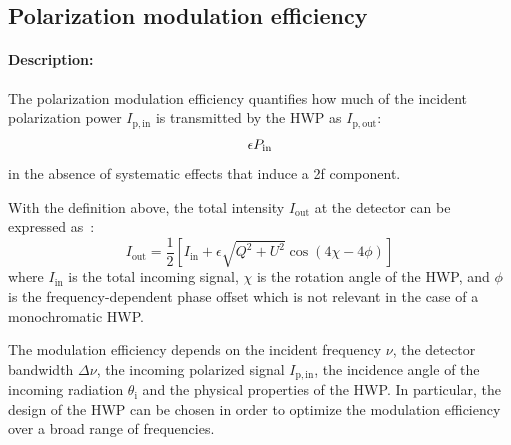 
\subsection{Polarization modulation efficiency}\label{subsec:modeff}

\paragraph{Description:}
The polarization modulation efficiency quantifies how much of the incident polarization power $I_\mathrm{p,in}$ is transmitted by the HWP as $I_\mathrm{p,out}$:
\begin{equation}
\epsilon\def \frac{P_\mathrm{out}}{P_\mathrm{in}}
\end{equation}
in the absence of systematic effects that induce a 2f component.

With the definition above, the total intensity $I_\mathrm{out}$ at the detector can be expressed as~\cite{Matsumura:2008zx}:
\begin{equation}
I_\mathrm{out}=\frac{1}{2}\left[I_\mathrm{in}+\epsilon\sqrt{Q^2+U^2} \cos(4\chi-4\phi)\right]
\end{equation}
where $I_\mathrm{in}$ is the total incoming signal, $\chi$ is the rotation angle of the HWP, and $\phi$ is the frequency-dependent phase offset which is not relevant in the case of a monochromatic HWP.

The modulation efficiency depends on the incident frequency $\nu$, the detector bandwidth $\Delta \nu$, the incoming polarized signal $I_\mathrm{p,in}$, the incidence angle of the incoming radiation $\theta_\mathrm{i}$ and the physical properties of the HWP. In particular, the design of the HWP can be chosen in order to optimize the modulation efficiency over a broad range of frequencies. 

